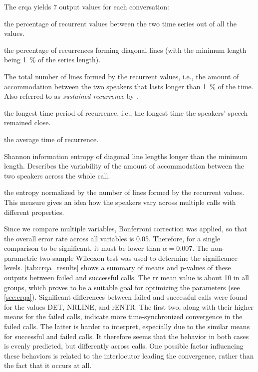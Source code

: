 The \ac{crqa} yields 7 output values for each conversation:

\begin{description}
	\item[\Acf{rr}] the percentage of recurrent values between the two time series out of all the values.
	\item[Percentage determinism (DET)] the percentage of recurrences forming diagonal lines (with the minimum length being \SI{1}{\percent} of the series length).
	\item[number of lines (NRLINE)] The total number of lines formed by the recurrent values, i.e., the amount of accommodation between the two speakers that lasts longer than \SI{1}{\percent} of the time.
	Also referred to as \emph{sustained recurrence} by \citet{Borrie2019syncing}.
	\item[Maximal length (maxL)] the longest time period of recurrence, i.e., the longest time the speakers' speech remained close.
	\item[Average length (L)] the average time of recurrence.
	\item[Entropy (ENTR)] Shannon information entropy of diagonal line lengths longer than the minimum length.
	Describes the variability of the amount of accommodation between the two speakers across the whole call.
	\item[Normalized entropy (rENTR)] the entropy normalized by the number of lines formed by the recurrent values.
	This measure gives an idea how the speakers vary across multiple calls with different properties.
\end{description}

Since we compare multiple variables, Bonferroni correction was applied, so that the overall error rate across all variables is \num{0.05}.
Therefore, for a single comparison to be significant, it must be lower than $\alpha = 0.007$.
The non-parametric two-sample Wilcoxon test \citep{Wilcoxon1945individual} was used to determine the significance levels.
\cref{tab:crqa_results} shows a summary of means and p-values of these outputs between failed and successful calls.
The \ac{rr} mean value is about 10 in all groups, which proves to be a suitable goal for optimizing the parameters (see \cref{sec:crqa}).
Significant differences between failed and successful calls were found for the values DET, NRLINE, and rENTR.
The first two, along with their higher means for the failed calls, indicate more time-synchronized convergence in the failed calls.
The latter is harder to interpret, especially due to the similar means for successful and failed calls.
It therefore seems that the behavior in both cases is evenly predicted, but differently across calls.
One possible factor influencing these behaviors is related to the interlocutor leading the convergence, rather than the fact that it occurs at all.

